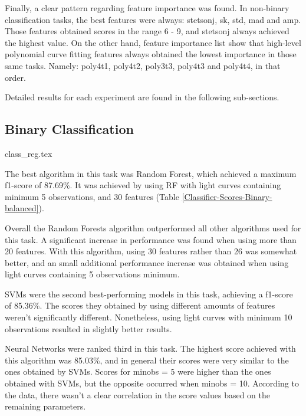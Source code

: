 
Finally, a clear pattern regarding feature importance was found. In non-binary classification tasks, the best features were always: stetson\textunderscore j, sk, std, mad and amp. Those features obtained scores in the range 6 - 9, and stetson\textunderscore j always achieved the highest value. On the other hand, feature importance list show that high-level polynomial curve fitting features always obtained the lowest importance in those same tasks. Namely: poly4\textunderscore t1, poly4\textunderscore t2, poly3\textunderscore t3, poly4\textunderscore t3 and poly4\textunderscore t4, in that order.

Detailed results for each experiment are found in the following sub-sections.


\subsection{Binary Classification} \label{Results-Binary}

{class_reg.tex}

The best algorithm in this task was Random Forest, which achieved a maximum f1-score of 87.69\%. It was achieved by using RF with light curves containing minimum 5 observations, and 30 features (Table \ref{Classifier-Scores-Binary-balanced}).

Overall the Random Forests algorithm outperformed all other algorithms used for this task. A significant increase in performance was found when using more than 20 features. With this algorithm, using 30 features rather than 26 was somewhat better, and an small additional performance increase was obtained when using light curves containing 5 observations minimum. 

SVMs were the second best-performing models in this task, achieving a f1-score of 85.36\%. The scores they obtained by using different amounts of features weren't significantly different. Nonetheless, using light curves with minimum 10 observations resulted in slightly better results.

Neural Networks were ranked third in this task. The highest score achieved with this algorithm was 85.03\%, and in general their scores were very similar to the ones obtained by SVMs. Scores for min\textunderscore obs = 5 were higher than the ones obtained with SVMs, but the opposite occurred when min\textunderscore obs = 10. According to the data, there wasn't a clear correlation in the score values based on the remaining parameters.


